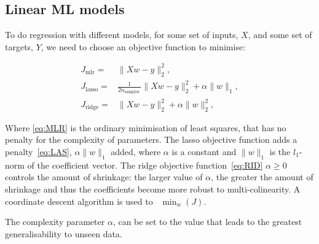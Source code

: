 \subsection{Linear ML models}

To do regression with different models, for some set of inputs, $X$, and
some set of targets, $Y$, we need to choose an objective function to minimise:

\begin{align}
J_{\mathrm{mlr}} = & \|X w-y\|_{2}^{2} \tag{MLR}, \label{eq:MLR} \\
J_{\mathrm{lasso}} = &
\frac{1}{2 n_{\text {samples }}}\|X w-y\|_{2}^{2}+\alpha\|w\|_{1} \tag{LAS}, \label{eq:LAS} \\
J_{\mathrm{ridge}} = &  \|X w-y\|_{2}^{2}+\alpha\|w\|_{2}^{2} \tag{RID}, \label{eq:RID}
\end{align}

Where \ref{eq:MLR} is the ordinary minimisation of least squares, that has no
penalty for the complexity of parameters.
The lasso objective function adds a penalty~\ref{eq:LAS},
$\alpha\|w\|_{1}$ added, where $\alpha$ is a constant and $\|w\|_{1}$ is the
$l_1$-norm of the coefficient vector.
The ridge objective function~\ref{eq:RID}
$\alpha\ge0$ controls the amount of shrinkage:
the larger value of $\alpha$,
the greater the amount of shrinkage
and thus the coefficients become more robust to multi-colinearity.
A coordinate descent algorithm is used to~\cite{scikit-learn}
$
\min _{w} (J)
$.

The complexity parameter $\alpha$, can be set to
the value that leads to the greatest generalisability to unseen data.
